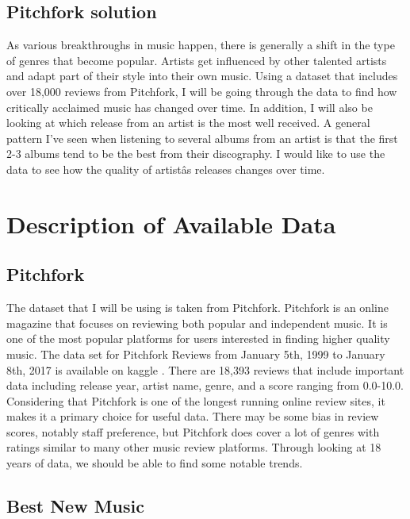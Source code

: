 \documentclass{article}
\begin{document}
\subsection{Pitchfork solution}\label{pitchfork-solution}

As various breakthroughs in music happen, there is generally a shift in
the type of genres that become popular. Artists get influenced by other
talented artists and adapt part of their style into their own music.
Using a dataset that includes over 18,000 reviews from Pitchfork, I will
be going through the data to find how critically acclaimed music has
changed over time. In addition, I will also be looking at which release
from an artist is the most well received. A general pattern I've seen
when listening to several albums from an artist is that the first 2-3
albums tend to be the best from their discography. I would like to use
the data to see how the quality of artistâs releases changes over
time.

\section{Description of Available
Data}\label{description-of-available-data}

\subsection{Pitchfork}\label{pitchfork}

The dataset that I will be using is taken from Pitchfork. Pitchfork is
an online magazine that focuses on reviewing both popular and
independent music. It is one of the most popular platforms for users
interested in finding higher quality music. The data set for Pitchfork
Reviews from January 5th, 1999 to January 8th, 2017 is available on
kaggle \citep{kaggle}. There are 18,393 reviews that include important
data including release year, artist name, genre, and a score ranging
from 0.0-10.0. Considering that Pitchfork is one of the longest running
online review sites, it makes it a primary choice for useful data. There
may be some bias in review scores, notably staff preference, but
Pitchfork does cover a lot of genres with ratings similar to many other
music review platforms. Through looking at 18 years of data, we should
be able to find some notable trends.

\subsection{Best New Music}\label{best-new-music}
\end{document}
